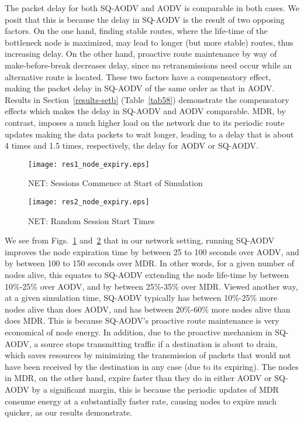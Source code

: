 The packet delay for both SQ-AODV and AODV is comparable in both cases. We posit that this is because the delay in SQ-AODV is the result of two opposing factors. On the one hand, finding stable routes, where the life-time of the bottleneck node is maximized, may lead to longer (but more stable) routes,
thus increasing delay. On the other hand, proactive route maintenance by way of make-before-break decreases delay, since no retransmissions need occur while an alternative route is located. These two factors have a compensatory effect, making the packet delay in SQ-AODV of the same order as that in AODV. Results in Section~\ref{results-setb} (Table~\ref{tab58}) demonstrate the compensatory effects which makes the delay in SQ-AODV and AODV comparable. MDR, by contrast, imposes a much higher load on the network due to its periodic route updates making the data packets to wait longer, leading to a delay that is about 4 times and 1.5 times, respectively, the delay for AODV or SQ-AODV. 

\begin{figure}[htbp]
	\centering
	\texttt{[image: res1\_node\_expiry.eps]}
	\caption{NET: Sessions Commence at Start of Simulation}
	\label{fig512}
\end{figure}


\begin{figure}[htbp]
	\centering
	\texttt{[image: res2\_node\_expiry.eps]}
	\caption{NET: Random Session Start Times}
	\label{fig513}
\end{figure}

We see from Figs.~\ref{fig512} and~\ref{fig513} that in our network setting, running SQ-AODV improves the node expiration time by between 25 to 100 seconds over AODV, and by between 100 to 150 seconds over MDR. In other words, for a given number of nodes alive, this equates to SQ-AODV extending the node life-time by between 10\%-25\% over AODV, and by between 25\%-35\% over MDR. Viewed another way, at a given simulation time, SQ-AODV typically has between 10\%-25\% more nodes alive than does AODV, and has between 20\%-60\% more
nodes alive than does MDR. This is because SQ-AODV's proactive route maintenance is very economical of node energy. In addition, due to the proactive mechanism in SQ-AODV, a source stops transmitting traffic if a destination is about to drain, which saves resources by minimizing the transmission of packets that would not have been received by the destination in any case (due to its expiring). The nodes in MDR, on the other hand, expire 
faster than they do in either AODV or SQ-AODV by a significant margin, this is because the periodic updates of MDR consume energy at a substantially
faster rate, causing nodes to expire much quicker, as our results demonstrate.

